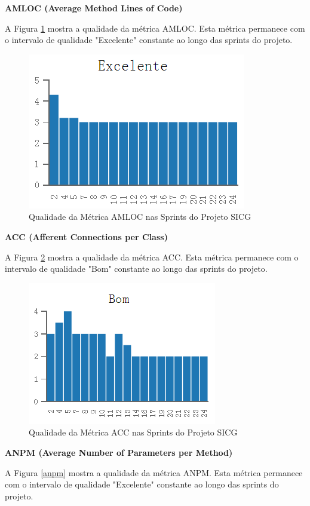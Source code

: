\textbf{AMLOC (Average Method Lines of Code)}

A Figura \ref{amloc} mostra a qualidade da métrica AMLOC. Esta métrica permanece com o intervalo de qualidade "Excelente" constante ao longo das sprints do projeto.

\begin{figure}[H]
		\centering
			\includegraphics[scale=1.0]{figuras/amloc.png}
		\caption{Qualidade da Métrica AMLOC nas Sprints do Projeto SICG}
		\label{amloc}
\end{figure}

\textbf{ACC (Afferent Connections per Class)}

A Figura \ref{acc} mostra a qualidade da métrica ACC. Esta métrica permanece com o intervalo de qualidade "Bom" constante ao longo das sprints do projeto.

\begin{figure}[H]
		\centering
			\includegraphics[scale=1.0]{figuras/acc.png}
		\caption{Qualidade da Métrica ACC nas Sprints do Projeto SICG}
		\label{acc}
\end{figure}

\textbf{ANPM (Average Number of Parameters per Method)}

A Figura \ref{anpm} mostra a qualidade da métrica ANPM. Esta métrica permanece com o intervalo de qualidade "Excelente" constante ao longo das sprints do projeto.

